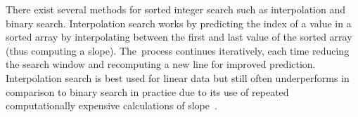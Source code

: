 There exist several methods for sorted integer search such as interpolation and binary search. Interpolation search works by predicting the index of a value in a sorted array by interpolating  between the first and last value of the sorted array (thus computing a slope). The~process continues iteratively, each time reducing the search window and recomputing a new line for improved prediction. Interpolation search is best used for linear data but still often underperforms in comparison to binary search in practice due to its use of repeated computationally expensive calculations of slope~\cite{van_sandt_efficiently_2019}.


